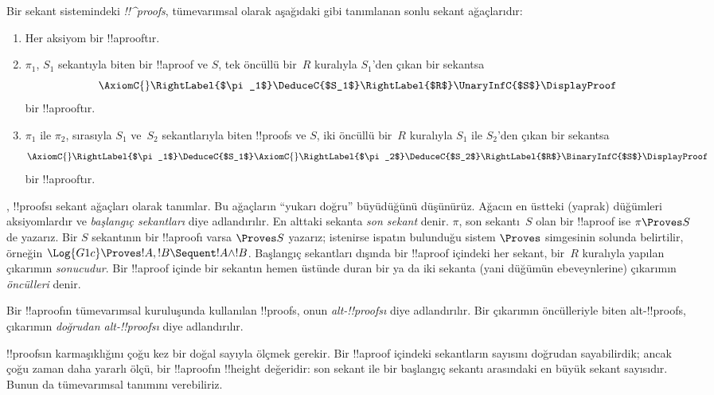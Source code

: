 \begin{defn}
Bir sekant sistemindeki \emph{!!^{proof}s}, tümevarımsal olarak aşağıdaki
gibi tanımlanan sonlu sekant ağaçlarıdır:
\begin{enumerate}
  \item{} Her aksiyom bir !!a{proof}{}tır.
  \item{} $\pi_1$, $S_1$ sekantıyla biten bir
  !!a{proof} ve $S$, tek öncüllü bir~$R$ kuralıyla $S_1$'den çıkan bir
  sekantsa
  \[
  \AxiomC{}
  \RightLabel{$\pi_1$}
  \DeduceC{$S_1$}
  \RightLabel{$R$}
  \UnaryInfC{$S$}
  \DisplayProof
  \]
  bir !!a{proof}{}tır.
  \item{} $\pi_1$ ile $\pi_2$, sırasıyla $S_1$
  ve~$S_2$ sekantlarıyla biten !!{proof}s ve $S$, iki öncüllü bir~$R$
  kuralıyla $S_1$ ile $S_2$'den çıkan bir sekantsa
  \[
  \AxiomC{}
  \RightLabel{$\pi_1$}
  \DeduceC{$S_1$}
  \AxiomC{}
  \RightLabel{$\pi_2$}
  \DeduceC{$S_2$}
  \RightLabel{$R$}
  \BinaryInfC{$S$}
  \DisplayProof
  \]
  bir !!a{proof}{}tır.
\end{enumerate}
\end{defn}

, !!{proof}s{}ı sekant ağaçları olarak tanımlar. Bu
ağaçların ``yukarı doğru'' büyüdüğünü düşünürüz. Ağacın en üstteki (yaprak)
düğümleri aksiyomlardır ve \emph{başlangıç sekantları} diye adlandırılır.
En alttaki sekanta \emph{son sekant} denir. $\pi$, son sekantı~$S$ olan bir
!!a{proof} ise $\pi \Proves S$ de yazarız. Bir $S$ sekantının bir
!!a{proof}{}ı varsa $\Proves S$ yazarız; istenirse ispatın bulunduğu
sistem $\Proves$ simgesinin solunda belirtilir, örneğin $\Log{G1c} \Proves
!A, !B \Sequent !A \land !B$. Başlangıç sekantları dışında bir !!a{proof}
içindeki her sekant, bir~$R$ kuralıyla yapılan çıkarımın \emph{sonucudur}.
Bir !!a{proof} içinde bir sekantın hemen üstünde duran bir ya da iki sekanta
(yani düğümün ebeveynlerine) çıkarımın \emph{öncülleri} denir.

Bir !!a{proof}{}ın tümevarımsal kuruluşunda kullanılan !!{proof}s, onun
\emph{alt-!!{proof}s{}ı} diye adlandırılır. Bir çıkarımın öncülleriyle biten
alt-!!{proof}s, çıkarımın \emph{doğrudan alt-!!{proof}s{}ı} diye adlandırılır.

!!{proof}s{}ın karmaşıklığını çoğu kez bir doğal sayıyla ölçmek gerekir.
Bir !!a{proof} içindeki sekantların sayısını doğrudan sayabilirdik; ancak
çoğu zaman daha yararlı ölçü, bir !!a{proof}{}ın !!{height} değeridir: son sekant
ile bir başlangıç sekantı arasındaki en büyük sekant sayısıdır. Bunun da
tümevarımsal tanımını verebiliriz.

